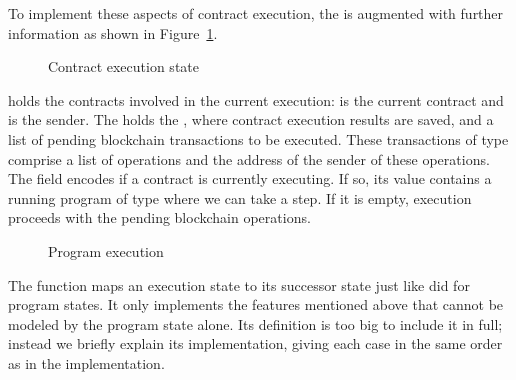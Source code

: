 \begin{comment}
When a contract execution terminates, the final stack interpretation will contain a pair
of a list of blockchain operations to be emitted by the contract as well as the updated
storage value of the contract.
Also contract execution is triggered by transfering some amount of Tezos tokens to it,
so it's balance and storage has to be updated and the emitted operations
must be staged for execution.
\end{comment}


To implement these aspects of contract execution, the 
is augmented with further information as shown in Figure~\ref{fig:contract-execution-state}.
\begin{figure}[tp]
  \ConcretePrgRunning
  \ConcreteTransaction
  \ConcreteExecState
  \caption{Contract execution state}
  \label{fig:contract-execution-state}
\end{figure}
 holds the contracts involved in the current
execution:  is the current contract and  is
the sender.
The  holds the , where contract execution results are saved,
and a list of pending blockchain transactions to be executed. These
transactions of type  comprise a list of operations and the address of the
sender of these operations.
The field  encodes if a contract is currently executing.
If so, its value contains a running program of type 
where we can take a step. If it is empty, execution
proceeds with the pending blockchain operations.

\begin{figure}[tp]
  \ConcreteExecStepProgram
  \caption{Program execution}
  \label{fig:exec-step-1}
\end{figure}
The function {\ConcreteExecStep} maps an execution state to its successor state
just like  did for program states.
It only implements the features mentioned above that cannot be modeled
by the program state alone.
Its definition is too big to include it in full; instead
we briefly explain its implementation, giving each case in the same
order as in the implementation.


